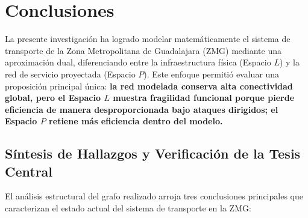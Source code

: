 \chapter{Conclusiones}

La presente investigación ha logrado modelar matemáticamente el sistema de transporte de la Zona Metropolitana de Guadalajara (ZMG) mediante una aproximación dual, diferenciando entre la infraestructura física (Espacio $L$) y la red de servicio proyectada (Espacio $P$). Este enfoque permitió evaluar una proposición principal única: \textbf{la red modelada conserva alta conectividad global, pero el Espacio \(L\) muestra fragilidad funcional porque pierde eficiencia de manera desproporcionada bajo ataques dirigidos; el Espacio \(P\) retiene más eficiencia dentro del modelo.}

\section{Síntesis de Hallazgos y Verificación de la Tesis Central}

El análisis estructural del grafo realizado arroja tres conclusiones principales que caracterizan el estado actual del sistema de transporte en la ZMG:

